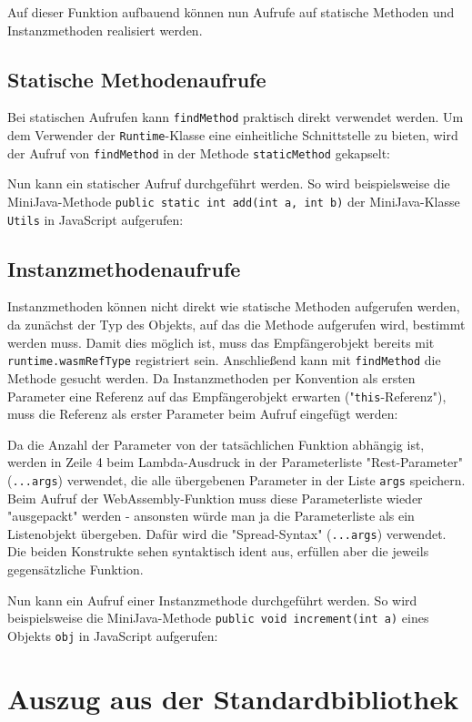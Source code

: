 

Auf dieser Funktion aufbauend können nun Aufrufe auf statische Methoden und Instanzmethoden realisiert werden.

\subsection{Statische Methodenaufrufe}

Bei statischen Aufrufen kann \lstinline{findMethod} praktisch direkt verwendet werden. Um dem Verwender der \lstinline{Runtime}-Klasse eine einheitliche Schnittstelle zu bieten, wird der Aufruf von \lstinline{findMethod} in der Methode \lstinline{staticMethod} gekapselt:



Nun kann ein statischer Aufruf durchgeführt werden. So wird beispielsweise die Mini\-Java-Methode \lstinline{public static int add(int a, int b)} der MiniJava-Klasse \lstinline{Utils} in Java\-Script aufgerufen:



\subsection{Instanzmethodenaufrufe}

Instanzmethoden können nicht direkt wie statische Methoden aufgerufen werden, da zunächst der Typ des Objekts, auf das die Methode aufgerufen wird, bestimmt werden muss. Damit dies möglich ist, muss das Empfängerobjekt bereits mit \lstinline{runtime.wasmRefType} registriert sein. Anschließend kann mit \lstinline{findMethod} die Methode gesucht werden. Da Instanzmethoden per Konvention als ersten Parameter eine Referenz auf das Empfängerobjekt erwarten ("\lstinline{this}-Referenz"), muss die Referenz als erster Parameter beim Aufruf eingefügt werden:



Da die Anzahl der Parameter von der tatsächlichen Funktion abhängig ist, werden in Zeile 4 beim Lambda-Ausdruck in der Parameterliste "Rest-Parameter" (\lstinline{...args}) \cite{MDNJavaScript} verwendet, die alle übergebenen Parameter in der Liste \lstinline{args} speichern. Beim Aufruf der WebAssembly-Funktion muss diese Parameterliste wieder "ausgepackt" werden - ansonsten würde man ja die Parameterliste als ein Listenobjekt übergeben. Dafür wird die "Spread-Syntax" (\lstinline{...args}) verwendet. Die beiden Konstrukte sehen syntaktisch ident aus, erfüllen aber die jeweils gegensätzliche Funktion.

Nun kann ein Aufruf einer Instanzmethode durchgeführt werden. So wird beispielsweise die MiniJava-Methode \lstinline{public void increment(int a)} eines Objekts \lstinline{obj} in JavaScript aufgerufen:



\section{Auszug aus der Standardbibliothek}
